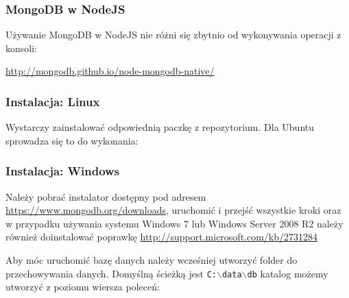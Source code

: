 \documentclass{beamer}
\begin{document}
  \begin{frame}
    \frametitle{MongoDB w NodeJS}
    Używanie MongoDB w NodeJS nie różni się zbytnio od wykonywania operacji z konsoli:
    
    \url{http://mongodb.github.io/node-mongodb-native/}
  \end{frame}

  \begin{frame}
    \frametitle{Instalacja: Linux}
    Wystarczy zainstalować odpowiednią paczkę z repozytorium. Dla Ubuntu sprowadza się to do wykonania:

    
  \end{frame}

  \begin{frame}
    \frametitle{Instalacja: Windows}
	Należy pobrać instalator dostępny pod adresem \url{https://www.mongodb.org/downloads}, uruchomić i przejść wszystkie kroki oraz w przypadku używania systemu Windows 7 lub Windows Server 2008 R2 należy również doinstalować poprawkę \url{http://support.microsoft.com/kb/2731284}
	
	Aby móc uruchomić bazę danych należy wcześniej utworzyć folder do przechowywania danych. Domyślną ścieżką jest \texttt{C:$\backslash$data$\backslash$db} katalog możemy utworzyć z poziomu wiersza poleceń:
	
	 
  \end{frame}
\end{document}
